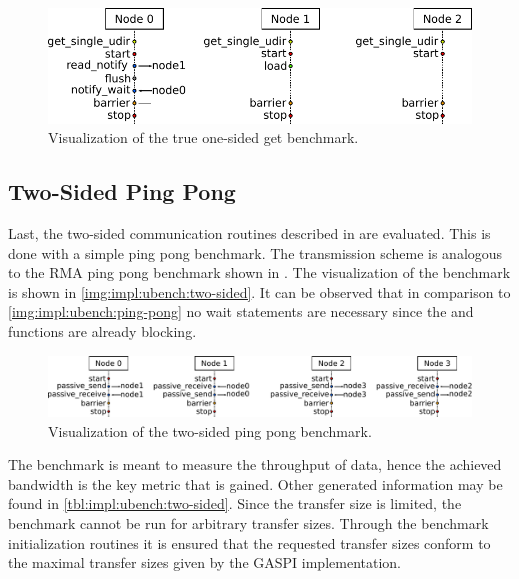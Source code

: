 \begin{figure}[htb]
\centering
\includegraphics[width=\textwidth]{img/bench-true-one-sided-get}
\caption{Visualization of the true one-sided get benchmark.}
\label{img:impl:ubench:true-onsided-get}
\end{figure}


\subsection{Two-Sided Ping Pong}
\label{ssec:impl:ubench:two-sided}

Last, the two-sided communication routines described in  are evaluated.  This is done with a simple ping pong benchmark. The transmission scheme is analogous to the \ac{RMA} ping pong benchmark shown in . The visualization of the benchmark is shown in \autoref{img:impl:ubench:two-sided}. It can be observed that in comparison to \autoref{img:impl:ubench:ping-pong} no wait statements are necessary since the \gaspiPassiveSend and \gaspiPassiveReceive functions are already blocking.

\begin{figure}[htb]
\centering
\includegraphics[width=\textwidth]{img/bench-twosided-ping-pong}
\caption{Visualization of the two-sided ping pong benchmark.}
\label{img:impl:ubench:two-sided}
\end{figure}

The benchmark is meant to measure the throughput of data, hence the achieved bandwidth is the key metric that is gained. Other generated information may be found in \autoref{tbl:impl:ubench:two-sided}. Since the transfer size is limited, the benchmark cannot be run for arbitrary transfer sizes. Through the benchmark initialization routines it is ensured that the requested transfer sizes conform to the maximal transfer sizes given by the \ac{GASPI} implementation.

